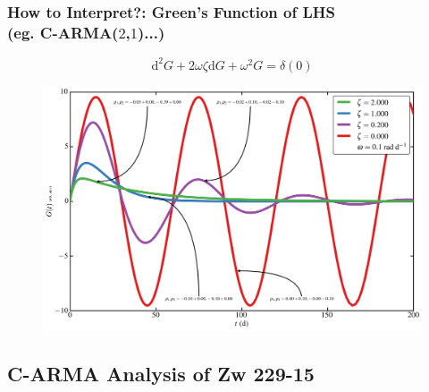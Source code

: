 \documentclass[hyperref={pdfpagelabels=false}]{beamer}
\begin{document}

\begin{frame}
\frametitle{How to Interpret?: Green's Function of LHS\\(eg. C-ARMA($2$,$1$)...)}
  \begin{equation*}\label{eq:CARMAGF} \mathrm{d}^{2}G + 2\omega\zeta \mathrm{d}G + \omega^{2}G = \delta(0) \end{equation*}
  \begin{figure}
    \includegraphics[scale=0.06]{images/CARMA(2,1)_GF.jpg}
  \end{figure}
\end{frame}

\subsection{C-ARMA Analysis of Zw 229-15}
\end{document}
